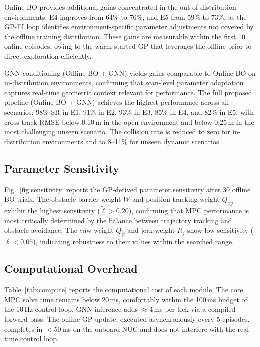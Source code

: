 \documentclass[conference]{IEEEtran}
\begin{document}
Online BO provides additional gains concentrated in the out-of-distribution environments: E4 improves from 64\% to 76\%, and E5 from 59\% to 73\%, as the GP-EI loop identifies environment-specific parameter adjustments not covered by the offline training distribution. These gains are measurable within the first 10 online episodes, owing to the warm-started GP that leverages the offline prior to direct exploration efficiently.

GNN conditioning (Offline BO + GNN) yields gains comparable to Online BO on in-distribution environments, confirming that scan-level parameter adaptation captures real-time geometric context relevant for performance. The full proposed pipeline (Online BO + GNN) achieves the highest performance across all scenarios: 98\% SR in E1, 91\% in E2, 93\% in E3, 85\% in E4, and 82\% in E5, with cross-track RMSE below 0.10\,m in the open environment and below 0.25\,m in the most challenging unseen scenario. The collision rate is reduced to zero for in-distribution environments and to 8--11\% for unseen dynamic scenarios.

\subsection{Parameter Sensitivity}

Fig.~\ref{fig:sensitivity} reports the GP-derived parameter sensitivity after 30 offline BO trials. The obstacle barrier weight $W$ and position tracking weight $Q_{xy}$ exhibit the highest sensitivity ($\tilde{\ell} > 0.20$), confirming that MPC performance is most critically determined by the balance between trajectory tracking and obstacle avoidance. The yaw weight $Q_\psi$ and jerk weight $R_j$ show low sensitivity ($\tilde{\ell} < 0.05$), indicating robustness to their values within the searched range.

\subsection{Computational Overhead}

Table~\ref{tab:compute} reports the computational cost of each module. The core MPC solve time remains below 20\,ms, comfortably within the 100\,ms budget of the 10\,Hz control loop. GNN inference adds $\approx$4\,ms per tick via a compiled forward pass. The online GP update, executed asynchronously every 5 episodes, completes in $<$50\,ms on the onboard NUC and does not interfere with the real-time control loop.
\end{document}
